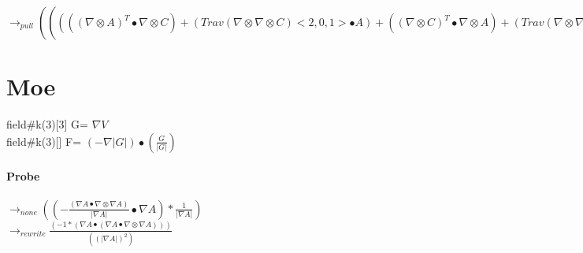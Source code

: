 \documentclass{article}
\begin{document}
\newline $\rightarrow_{pull}((((( \nabla  \otimes A)^T \bullet  \nabla  \otimes C)+(Trav( \nabla  \otimes  \nabla  \otimes C)<2,0,1> \bullet A)+(( \nabla  \otimes C)^T \bullet  \nabla  \otimes A)+(Trav( \nabla  \otimes  \nabla  \otimes A)<2,0,1> \bullet C))* \frac{1}{(|C|*|A|)}+(((C \bullet A)*((A \bullet  \nabla  \otimes A) \otimes (A \bullet  \nabla  \otimes A)))+(2*(C \bullet A)*((A \bullet  \nabla  \otimes A) \otimes (A \bullet  \nabla  \otimes A))))* \frac{1}{(|A|*|C|*((A \bullet A))^2)}+((((C \bullet A)*((A \bullet  \nabla  \otimes A)*(C \bullet  \nabla  \otimes C))))^T+((C \bullet A)*((A \bullet  \nabla  \otimes A) \otimes (C \bullet  \nabla  \otimes C))))* \frac{1}{((C \bullet C)*|A|*|C|*(A \bullet A))}+((C \bullet A)*((C \bullet  \nabla  \otimes C) \otimes (C \bullet  \nabla  \otimes C)))* \frac{1}{(|C|*|A|*((C \bullet C))^2)}+(2*|C|*(C \bullet A)*((C \bullet  \nabla  \otimes C) \otimes (C \bullet  \nabla  \otimes C)))* \frac{1}{(|A|*(C \bullet C)*((C \bullet C))^2)})-(((((((((( \nabla  \otimes C)^T \bullet A) \otimes (A \bullet  \nabla  \otimes A)))+((C \bullet A)*(A \bullet  \nabla  \otimes  \nabla  \otimes A)))+((C \bullet A)*(( \nabla  \otimes A)^T \bullet  \nabla  \otimes A)))+((((( \nabla  \otimes C)^T \bullet A)*(A \bullet  \nabla  \otimes A))))^T)+((((C \bullet  \nabla  \otimes A)*(A \bullet  \nabla  \otimes A))))^T)+(((C \bullet  \nabla  \otimes A) \otimes (A \bullet  \nabla  \otimes A))))* \frac{1}{(|C|*|A|*(A \bullet A))}+(((((((( \nabla  \otimes C)^T \bullet A)*(C \bullet  \nabla  \otimes C))))^T+(((( \nabla  \otimes C)^T \bullet A) \otimes (C \bullet  \nabla  \otimes C))))+((((C \bullet  \nabla  \otimes A)*(C \bullet  \nabla  \otimes C))))^T)+(((( \nabla  \otimes A)^T \bullet C) \otimes (C \bullet  \nabla  \otimes C))))* \frac{1}{(|A|*|C|*(C \bullet C))}+((|C|*(C \bullet A)*(( \nabla  \otimes C)^T \bullet  \nabla  \otimes C))+(|C|*(C \bullet A)*(C \bullet  \nabla  \otimes  \nabla  \otimes C)))* \frac{1}{(|A|*(C \bullet C)*(C \bullet C))}))$



\newpage
 \section{Moe}
   field\#k(3)[3] G= $\nabla V$\\
 field\#k(3)[] F= $(-\nabla|G|)\bullet(\frac{G}{|G|})$
\paragraph{Probe} 
$\rightarrow_{none} ((-{ \frac{( \nabla A \bullet  \nabla  \otimes  \nabla A)}{| \nabla A|}} \bullet  \nabla A)* \frac{1}{| \nabla A|})$
 \\ \newline $\rightarrow_{rewrite} \frac{(-1*( \nabla A \bullet ( \nabla A \bullet  \nabla  \otimes  \nabla A)))}{((| \nabla A|)^2)}$
\end{document}
